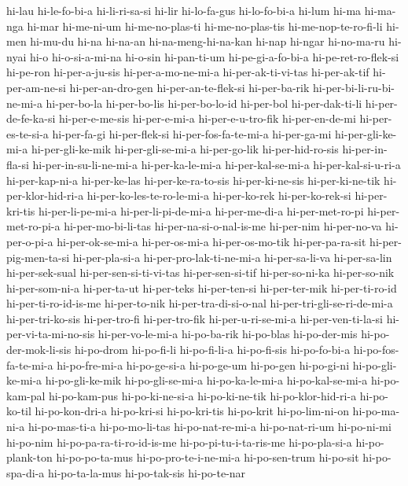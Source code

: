 {hi-lau hi-le-fo-bi-a hi-li-ri-sa-si hi-lir hi-lo-fa-gus hi-lo-fo-bi-a
hi-lum hi-ma hi-ma-nga hi-mar hi-me-ni-um hi-me-no-plas-ti
hi-me-no-plas-tis hi-me-nop-te-ro-fi-li hi-men hi-mu-du hi-na hi-na-an
hi-na-meng-hi-na-kan hi-nap hi-ngar hi-no-ma-ru hi-nyai hi-o
hi-o-si-a-mi-na hi-o-sin hi-pan-ti-um hi-pe-gi-a-fo-bi-a
hi-pe-ret-ro-flek-si hi-pe-ron hi-per-a-ju-sis hi-per-a-mo-ne-mi-a
hi-per-ak-ti-vi-tas hi-per-ak-tif hi-per-am-ne-si hi-per-an-dro-gen
hi-per-an-te-flek-si hi-per-ba-rik hi-per-bi-li-ru-bi-ne-mi-a hi-per-bo-la
hi-per-bo-lis hi-per-bo-lo-id hi-per-bol hi-per-dak-ti-li
hi-per-de-fe-ka-si hi-per-e-me-sis hi-per-e-mi-a hi-per-e-u-tro-fik
hi-per-en-de-mi hi-per-es-te-si-a hi-per-fa-gi hi-per-flek-si
hi-per-fos-fa-te-mi-a hi-per-ga-mi hi-per-gli-ke-mi-a hi-per-gli-ke-mik
hi-per-gli-se-mi-a hi-per-go-lik hi-per-hid-ro-sis hi-per-in-fla-si
hi-per-in-su-li-ne-mi-a hi-per-ka-le-mi-a hi-per-kal-se-mi-a
hi-per-kal-si-u-ri-a hi-per-kap-ni-a hi-per-ke-las hi-per-ke-ra-to-sis
hi-per-ki-ne-sis hi-per-ki-ne-tik hi-per-klor-hid-ri-a
hi-per-ko-les-te-ro-le-mi-a hi-per-ko-rek hi-per-ko-rek-si hi-per-kri-tis
hi-per-li-pe-mi-a hi-per-li-pi-de-mi-a hi-per-me-di-a hi-per-met-ro-pi
hi-per-met-ro-pi-a hi-per-mo-bi-li-tas hi-per-na-si-o-nal-is-me hi-per-nim
hi-per-no-va hi-per-o-pi-a hi-per-ok-se-mi-a hi-per-os-mi-a
hi-per-os-mo-tik hi-per-pa-ra-sit hi-per-pig-men-ta-si hi-per-pla-si-a
hi-per-pro-lak-ti-ne-mi-a hi-per-sa-li-va hi-per-sa-lin hi-per-sek-sual
hi-per-sen-si-ti-vi-tas hi-per-sen-si-tif hi-per-so-ni-ka hi-per-so-nik
hi-per-som-ni-a hi-per-ta-ut hi-per-teks hi-per-ten-si hi-per-ter-mik
hi-per-ti-ro-id hi-per-ti-ro-id-is-me hi-per-to-nik hi-per-tra-di-si-o-nal
hi-per-tri-gli-se-ri-de-mi-a hi-per-tri-ko-sis hi-per-tro-fi
hi-per-tro-fik hi-per-u-ri-se-mi-a hi-per-ven-ti-la-si
hi-per-vi-ta-mi-no-sis hi-per-vo-le-mi-a hi-po-ba-rik hi-po-blas
hi-po-der-mis hi-po-der-mok-li-sis hi-po-drom hi-po-fi-li hi-po-fi-li-a
hi-po-fi-sis hi-po-fo-bi-a hi-po-fos-fa-te-mi-a hi-po-fre-mi-a
hi-po-ge-si-a hi-po-ge-um hi-po-gen hi-po-gi-ni hi-po-gli-ke-mi-a
hi-po-gli-ke-mik hi-po-gli-se-mi-a hi-po-ka-le-mi-a hi-po-kal-se-mi-a
hi-po-kam-pal hi-po-kam-pus hi-po-ki-ne-si-a hi-po-ki-ne-tik
hi-po-klor-hid-ri-a hi-po-ko-til hi-po-kon-dri-a hi-po-kri-si
hi-po-kri-tis hi-po-krit hi-po-lim-ni-on hi-po-ma-ni-a hi-po-mas-ti-a
hi-po-mo-li-tas hi-po-nat-re-mi-a hi-po-nat-ri-um hi-po-ni-mi hi-po-nim
hi-po-pa-ra-ti-ro-id-is-me hi-po-pi-tu-i-ta-ris-me hi-po-pla-si-a
hi-po-plank-ton hi-po-po-ta-mus hi-po-pro-te-i-ne-mi-a hi-po-sen-trum
hi-po-sit hi-po-spa-di-a hi-po-ta-la-mus hi-po-tak-sis hi-po-te-nar
}
